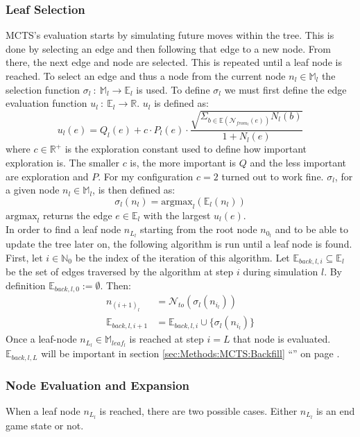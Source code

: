 \documentclass[12pt]{article}
\newcommand{\sectionref}[1]{section \ref{#1} ``\nameref{#1}'' on page \pageref{#1}}
\begin{document}
\subsubsection{Leaf Selection} \label{sec:Methods:MCTS:Leaf_selection}
MCTS's evaluation starts by simulating future moves within the tree. This is done by selecting an edge and then following that edge to a new node. From there, the next edge and node are selected. This is repeated until a leaf node is reached. To select an edge and thus a node from the current node \(n_l\in \mathbb{M}_l\) the selection function \(\sigma_l~:~\mathbb M_l \to\mathbb E_l\) is used. To define \(\sigma_l\) we must first define the edge evaluation function \(u_l~:~\mathbb{E}_{l}\to\mathbb{R}\). \(u_l\) is defined as:
\begin{equation}
u_l(e) = Q_l(e) + c \cdot P_l(e)\cdot\frac{\sqrt{\Sigma_{b\in\mathbb{E}(\mathcal{N}_{from_l}(e))}N_l(b)}}{1+N_l(e)}
\end{equation}
where \(c\in \mathbb{R}^+\) is the exploration constant used to define how important exploration is. The smaller \(c\) is, the more important is \(Q\) and the less important are exploration and \(P\). For my configuration \(c = 2\) turned out to work fine. \(\sigma_l\), for a given node \(n_l\in\mathbb{M}_l\), is then defined as:
\begin{equation}\label{eq:sigma}
\sigma_l(n_l) = \text{argmax}_l(\mathbb{E}_l(n_l))
\end{equation}
\(\text{argmax}_l\) returns the edge \(e \in\mathbb E_l\) with the largest \(u_l(e)\).\\
In order to find a leaf node \(n_{L_l}\) starting from the root node \(n_{0_l}\) and to be able to update the tree later on, the following algorithm is run until a leaf node is found. First, let \(i \in\mathbb N_0\) be the index of the iteration of this algorithm. Let \(\mathbb E_{back,l,i} \subseteq \mathbb E_l\) be the set of edges traversed by the algorithm at step \(i\) during simulation \(l\). By definition \(\mathbb E_{back,l,0} := \emptyset\). Then:
\begin{align}
n_{(i+1)_l} &= \mathcal N_{to}(\sigma_l (n_{i_l}))\\
\mathbb E_{back,l,i+1} &= \mathbb E_{back,l,i} \cup \{\sigma_l (n_{i_l})\}
\end{align}
Once a leaf-node \(n_{L_l}\in\mathbb{M}_{leaf_l}\) is reached at step \(i = L\) that node is evaluated. \(\mathbb E_{back,l,L}\) will be important in \sectionref{sec:Methods:MCTS:Backfill}. 


\subsubsection{Node Evaluation and Expansion}
\label{sec:Methods:MCTS:Node Evaluation and Expansion}
When a leaf node \(n_{L_l}\) is reached, there are two possible cases. Either \(n_{L_l}\) is an end game state or not.
\end{document}
